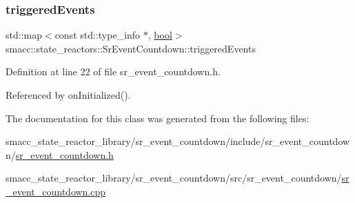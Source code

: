 \mbox{\label{classsmacc_1_1state__reactors_1_1SrEventCountdown_a6f9b3a51e8e8becbf76f99a5d0bcb8c5}} 
\subsubsection{\texorpdfstring{triggered\+Events}{triggeredEvents}}
{\footnotesize\ttfamily std\+::map$<$const std\+::type\+\_\+info $\ast$, \hyperlink{classbool}{bool}$>$ smacc\+::state\+\_\+reactors\+::\+Sr\+Event\+Countdown\+::triggered\+Events\hspace{0.3cm}{\ttfamily [private]}}



Definition at line 22 of file sr\+\_\+event\+\_\+countdown.\+h.



Referenced by on\+Initialized().



The documentation for this class was generated from the following files\+:\begin{DoxyCompactItemize}
\item 
smacc\+\_\+state\+\_\+reactor\+\_\+library/sr\+\_\+event\+\_\+countdown/include/sr\+\_\+event\+\_\+countdown/\hyperlink{sr__event__countdown_8h}{sr\+\_\+event\+\_\+countdown.\+h}\item 
smacc\+\_\+state\+\_\+reactor\+\_\+library/sr\+\_\+event\+\_\+countdown/src/sr\+\_\+event\+\_\+countdown/\hyperlink{sr__event__countdown_8cpp}{sr\+\_\+event\+\_\+countdown.\+cpp}\end{DoxyCompactItemize}
